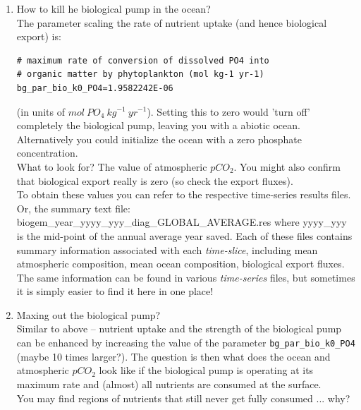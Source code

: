 \begin{enumerate}[noitemsep]

\vspace{1mm}
\item How to kill he biological pump in the ocean?
\\The parameter scaling the rate of nutrient uptake (and hence biological export) is:
\vspace{-1mm}\small\begin{verbatim}
# maximum rate of conversion of dissolved PO4 into 
# organic matter by phytoplankton (mol kg-1 yr-1)
bg_par_bio_k0_PO4=1.9582242E-06
\end{verbatim}\normalsize\vspace{-1mm}
(in units of \(mol\:PO_{4} \:kg^{-1} \:yr^{-1}\)). Setting this to zero would 'turn off' completely the biological pump, leaving you with a abiotic ocean. Alternatively you could initialize the ocean with a zero phosphate concentration.
\vspace{1mm}
\\What to look for? The value of atmospheric \(pCO_{2}\). You might also confirm that biological export really is zero (so check the export fluxes).
\vspace{1mm}
\\To obtain these values you can refer to the respective time-series results files. Or,  the summary text file: \textsf{\footnotesize biogem\_year\_yyyy\_yyy\_diag\_GLOBAL\_AVERAGE.res}
where \textsf{\footnotesize yyyy\_yyy} is the mid-point of the annual average year saved. Each of these files contains summary information associated with  each \textit{time-slice}, including mean atmospheric composition, mean ocean composition, biological export fluxes. The same information can be found in various \textit{time-series} files, but sometimes it is simply easier to find it here in one place!

\vspace{1mm}
\item Maxing out the biological pump?
\\Similar to above -- nutrient uptake and the strength of the biological pump can be enhanced by increasing the value of the parameter \texttt{bg\_par\_bio\_k0\_PO4} (maybe 10 times larger?).
The question is then what does the ocean and atmospheric \(pCO_{2}\) look like if the biological pump is operating at its maximum rate and (almost) all nutrients are consumed at the surface.
\\You may find regions of nutrients that still never get fully consumed ... why?


\end{enumerate}

